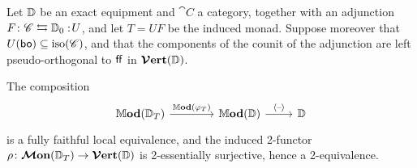 \documentclass[12pt,oneside,article,draft]{memoir}
\begin{document}
\begin{theorem}\label{thm:Verts}
   Let $\mathbb{D}$ be an exact equipment and $\cat{C}$ a category, together with an adjunction
   $F\colon\mathscr{C}\leftrightarrows\mathbb{D}_0:\!U$, and let $T=UF$ be the induced monad. Suppose
   moreover that $U(\mathsf{bo})\subseteq\mathrm{iso}(\mathscr{C})$, and that the components of the counit of
   the adjunction are left pseudo-orthogonal to $\mathsf{ff}$ in $\bm{\mathcal{V}}\mathbf{ert}(\mathbb{D})$.

   The composition
   \begin{equation*}
      \begin{tikzcd}
         \dMod(\dcat{D}_T)\ar[r,"\dMod(\varphi_T)"] &[1.5em] \dMod(\dcat{D}) \ar[r,"\Col{\textrm{--}}"] & \dcat{D}
      \end{tikzcd}
   \end{equation*}
   is a fully faithful local equivalence, and the induced 2-functor
   $\rho\colon\bm{\mathcal{M}}\mathbf{on}(\mathbb{D}_T)\to\bm{\mathcal{V}}\mathbf{ert}(\mathbb{D})$ is 2-essentially surjective, hence a 2-equivalence.
\end{theorem}
\end{document}
